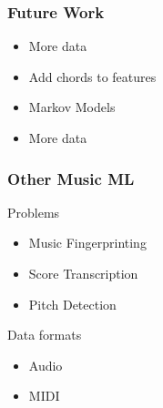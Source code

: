 \documentclass{beamer}
\begin{document}
\begin{frame}
\frametitle{Future Work}
\begin{itemize}
\item More data
\item Add chords to features
\item Markov Models
\item More data
\end{itemize}
\end{frame}


\begin{frame}
  \frametitle{Other Music ML}
  Problems
  \begin{itemize}
  \item Music Fingerprinting
  \item Score Transcription
  \item Pitch Detection
  \end{itemize}
  Data formats
  \begin{itemize}
  \item Audio
  \item MIDI
  \end{itemize}
\end{frame}
\end{document}
